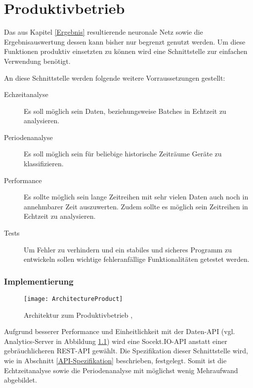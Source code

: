 \chapter{Produktivbetrieb}
    Das aus Kapitel \ref{Ergebnis} resultierende neuronale Netz sowie die Ergebnisauswertung dessen kann bisher nur begrenzt genutzt werden.
    Um diese Funktionen produktiv einsetzten zu können wird eine Schnittstelle zur einfachen Verwendung benötigt.
    
    An diese Schnittstelle werden folgende weitere Vorraussetzungen gestellt:
    \begin{description}
        \item[Echzeitanalyse] Es soll möglich sein Daten, beziehungsweise Batches in Echtzeit zu analysieren.
        \item[Periodenanalyse] Es soll möglich sein für beliebige historische Zeiträume Geräte zu klassifizieren.
        \item[Performance] Es sollte möglich sein lange Zeitreihen mit sehr vielen Daten auch noch in annehmbarer Zeit auszuwerten. Zudem sollte es möglich sein Zeitreihen in Echtzeit zu analysieren.
        \item[Tests] Um Fehler zu verhindern und ein stabiles und sicheres Programm zu entwickeln sollen wichtige fehleranfällige Funktionalitäten getestet werden.
    \end{description}
    
    \subsection{Implementierung}

        \begin{figure}[h]
            \centering
            \texttt{[image: ArchitectureProduct]}
            \caption{Architektur zum Produktivbetrieb \protect\cite{DrawIO}, \protect\cite{Tensorflow}}
            \label{fig:ArchitectureProduct}
        \end{figure}

        Aufgrund besserer Performance und Einheitlichkeit mit der Daten-API (vgl. Analytics-Server in Abbildung \ref{fig:ArchitectureProduct}) wird eine Socekt.IO-API anstatt einer gebräuchlicheren REST-API gewählt.
        Die Spezifikation dieser Schnittstelle wird, wie in Abschnitt \ref{API-Spezifikation} beschrieben, festgelegt. 
        Somit ist die Echtzeitanalyse sowie die Periodenanalyse mit möglichst wenig Mehraufwand abgebildet.
        \newline

